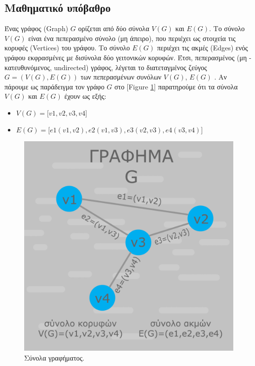 \subsection{Μαθηματικό υπόβαθρο}
Ένας γράφος (Graph) $G$ ορίζεται από δύο σύνολα $V(G)$ και $E(G)$. Το σύνολο $V(G)$ είναι ένα πεπερασμένο σύνολο (μη άπειρο), που περιέχει ως στοιχεία τις κορυφές (Vertices) του γράφου. Το σύνολο $E(G)$ περιέχει τις ακμές (Edges) ενός γράφου εκφρασμένες με δισύνολα δύο γειτονικών κορυφών. Έτσι, πεπερασμένος (μη - κατευθυνόμενος, undirected) γράφος, λέγεται το διατεταγμένος ζεύγος $G = (V(G), E(G))$ των πεπερασμένων συνόλων $V(G)$, $E(G)$ \cite{ntenisiwtis2023thewria}. Αν πάρουμε ως παράδειγμα τον γράφο $G$ στο [Figure \ref{7}] παρατηρούμε ότι τα σύνολα $V(G)$ και $E(G)$ έχουν ως εξής: 
\begin{itemize}
  \item $V(G)=$[$v1,v2,v3,v4$]
  \item $E(G)=$[$e1(v1,v2),e2(v1,v3),e3(v2,v3),e4(v3,v4)$] 
\end{itemize}

\begin{figure}
    \centering
    \includegraphics[scale=0.30]{2947_thesis/pictures/synola.png} 
    \caption{Σύνολα γραφήματος.}
    \label{7}
\end{figure}

